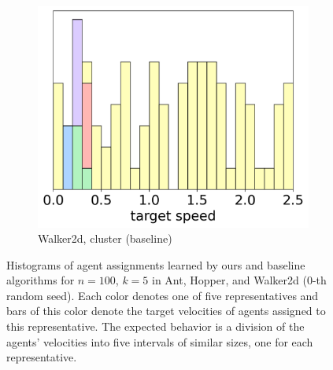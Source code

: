\begin{figure}[t]
\begin{center}
    \begin{subfigure}{0.3\textwidth}
        \centering
        \caption{Walker2d, cluster (baseline)}
        \includegraphics[width=\linewidth]{pics/histograms/cluster/Walker2d.png}
    \end{subfigure}
\caption{Histograms of agent assignments learned by ours and baseline algorithms for $n=100$, $k=5$ in Ant, Hopper, and Walker2d ($0$-th random seed). Each color denotes one of five representatives and bars of this color denote the target velocities of agents assigned to this representative. The expected behavior is a division of the agents' velocities into five intervals of similar sizes, one for each representative.}
\label{fig:results_histograms_app}
\end{center}
\end{figure}







% 



% 
